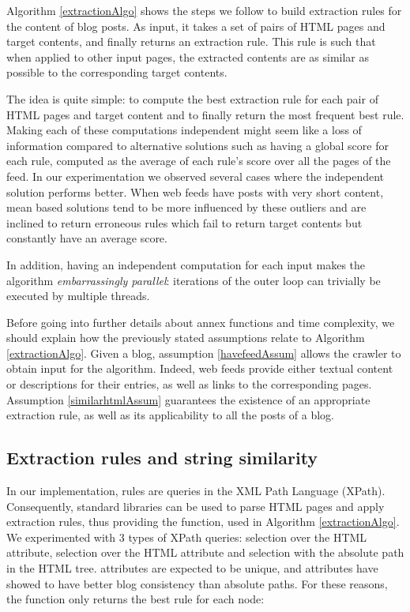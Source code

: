 \extractionAlgo

Algorithm \ref{extractionAlgo} shows the steps we follow to build extraction rules for the content of blog posts. As input, it takes a set of pairs of HTML pages and target contents, and finally returns an extraction rule. This rule is such that when applied to other input pages, the extracted contents are as similar as possible to the corresponding target contents.

The idea is quite simple: to compute the best extraction rule for each pair of HTML pages and target content and to finally return the most frequent best rule. Making each of these computations independent might seem like a loss of information compared to alternative solutions such as having a global score for each rule, computed as the average of each rule's score over all the pages of the feed. In our experimentation we observed several cases where the independent solution performs better. When web feeds have posts with very short content, mean based solutions tend to be more influenced by these outliers and are inclined to return erroneous rules which fail to return target contents but constantly have an average score.

In addition, having an independent computation for each input makes the algorithm \emph{embarrassingly parallel}: iterations of the outer loop can trivially be executed by multiple threads.

Before going into further details about annex functions and time complexity, we should explain how the previously stated assumptions relate to Algorithm \ref{extractionAlgo}. Given a blog, assumption \ref{havefeedAssum} allows the crawler to obtain input for the algorithm. Indeed, web feeds provide either textual content or descriptions for their entries, as well as links to the corresponding pages. Assumption \ref{similarhtmlAssum} guarantees the existence of an appropriate extraction rule, as well as its applicability to all the posts of a blog.


\subsection{Extraction rules and string similarity}
In our implementation, rules are queries in the XML Path Language (XPath). Consequently, standard libraries can be used to parse HTML pages and apply extraction rules, thus providing the  function, used in Algorithm \ref{extractionAlgo}. We experimented with 3 types of XPath queries: selection over the HTML  attribute, selection over the HTML  attribute and selection with the absolute path in the HTML tree.  attributes are expected to be unique, and  attributes have showed to have better blog consistency than absolute paths. For these reasons, the  function only returns the best rule for each node:

